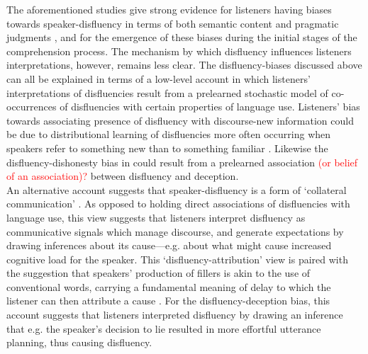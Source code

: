 \documentclass[a4paper,man,natbib]{apa6}
\begin{document}
The aforementioned studies give strong evidence for listeners having biases towards speaker-disfluency in terms of both semantic content \citep{Arnold2004, Barr2001} and pragmatic judgments \citep{Loy2016}, and for the emergence of these biases during the initial stages of the comprehension process.
The mechanism by which disfluency influences listeners interpretations, however, remains less clear. 
The disfluency-biases discussed above can all be explained in terms of a low-level account in which listeners' interpretations of disfluencies result from a prelearned stochastic model of co-occurrences of disfluencies with certain properties of language use. 
Listeners' bias towards associating presence of disfluency with discourse-new information could be due to distributional learning of disfluencies more often occurring when speakers refer to something new than to something familiar \citep{Arnold2004, Barr2001}. 
Likewise the disfluency-dishonesty bias in \citet{Loy2016} could result from a prelearned association \textcolor{red}{(or belief of an association)?} between disfluency and deception.\\

An alternative account suggests that speaker-disfluency is a form of `collateral communication' \citep{Clark1996}. 
As opposed to holding direct associations of disfluencies with language use, this view suggests that listeners interpret disfluency as communicative signals which manage discourse, and generate expectations by drawing inferences about its cause---e.g. about what might cause increased cognitive load for the speaker. 
This `disfluency-attribution' view is paired with the suggestion that speakers' production of fillers is akin to the use of conventional words, carrying a fundamental meaning of delay to which the listener can then attribute a cause \citep{Clark2002}.
For the disfluency-deception bias, this account suggests that listeners interpreted disfluency by drawing an inference that e.g. the speaker's decision to lie resulted in more effortful utterance planning, thus causing disfluency.\\
\end{document}
